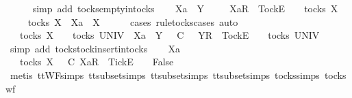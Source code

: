 \begin{isabellebody}
\ \ \ \ \isamarkupfalse%
\ {\isacharparenleft}simp\ add{\isacharcolon}\ tocks{\isachardot}empty{\isacharunderscore}in{\isacharunderscore}tocks{\isacharparenright}\isanewline
{}\isamarkupfalse%
\isanewline
\ \ \isamarkupfalse%
\ Xa\ {\isasymrho}\ Y\ {\isasymsigma}\isanewline
\ \ \isamarkupfalse%
\ {\isachardoublequoteopen}{\isacharbrackleft}Xa{\isacharbrackright}\isactrlsub R\ {\isacharhash}\ {\isacharbrackleft}Tock{\isacharbrackright}\isactrlsub E\ {\isacharhash}\ {\isasymrho}\ {\isasymin}\ tocks\ X{\isachardoublequoteclose}\isanewline
\ \ \isamarkupfalse%
\ \isamarkupfalse%
\ {\isachardoublequoteopen}{\isasymrho}\ {\isasymin}\ tocks\ X\ {\isasymand}\ Xa\ {\isasymsubseteq}\ X{\isachardoublequoteclose}\isanewline
\ \ \ \ \isamarkupfalse%
\ {\isacharparenleft}cases\ rule{\isacharcolon}tocks{\isachardot}cases{\isacharcomma}\ auto{\isacharparenright}\isanewline
\ \ \isamarkupfalse%
\ \isamarkupfalse%
\ {\isachardoublequoteopen}{\isacharparenleft}{\isasymrho}\ {\isasymin}\ tocks\ X\ {\isasymLongrightarrow}\ {\isasymsigma}\ {\isasymin}\ tocks\ UNIV{\isacharparenright}\ {\isasymLongrightarrow}\ Xa\ {\isasymsubseteq}\ Y\ {\isasymLongrightarrow}\ {\isasymrho}\ {\isasymsubseteq}\isactrlsub C\ {\isasymsigma}\ {\isasymLongrightarrow}\ {\isacharbrackleft}Y{\isacharbrackright}\isactrlsub R\ {\isacharhash}\ {\isacharbrackleft}Tock{\isacharbrackright}\isactrlsub E\ {\isacharhash}\ {\isasymsigma}\ {\isasymin}\ tocks\ UNIV{\isachardoublequoteclose}\isanewline
\ \ \ \ \isamarkupfalse%
\ {\isacharparenleft}simp\ add{\isacharcolon}\ tocks{\isachardot}tock{\isacharunderscore}insert{\isacharunderscore}in{\isacharunderscore}tocks{\isacharparenright}\isanewline
{}\isamarkupfalse%
\isanewline
\ \ \isamarkupfalse%
\ Xa\ {\isasymrho}\ {\isasymsigma}\isanewline
\ \ \isamarkupfalse%
\ {\isachardoublequoteopen}{\isasymrho}\ {\isasymin}\ tocks\ X\ {\isasymLongrightarrow}\ {\isasymrho}\ {\isasymsubseteq}\isactrlsub C\ {\isacharbrackleft}Xa{\isacharbrackright}\isactrlsub R\ {\isacharhash}\ {\isacharbrackleft}Tick{\isacharbrackright}\isactrlsub E\ {\isacharhash}\ {\isasymsigma}\ {\isasymLongrightarrow}\ False{\isachardoublequoteclose}\isanewline
\ \ \ \ \isamarkupfalse%
\ {\isacharparenleft}metis\ ttWF{\isachardot}simps{\isacharparenleft}{}{}{\isacharparenright}\ tt{\isacharunderscore}subset{\isachardot}simps{\isacharparenleft}{}{\isacharparenright}\ tt{\isacharunderscore}subset{\isachardot}simps{\isacharparenleft}{}{\isacharparenright}\ tt{\isacharunderscore}subset{\isachardot}simps{\isacharparenleft}{}{\isacharparenright}\ tocks{\isachardot}simps\ tocks{\isacharunderscore}wf{\isacharparenright}\isanewline

\end{isabellebody}
